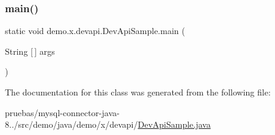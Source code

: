 \mbox{\label{classdemo_1_1x_1_1devapi_1_1_dev_api_sample_a9fecf4c0145ac4788eb0768d9f1d04a4}} 
\subsubsection{\texorpdfstring{main()}{main()}}
{\footnotesize\ttfamily static void demo.\+x.\+devapi.\+Dev\+Api\+Sample.\+main (\begin{DoxyParamCaption}\item[{String \mbox{[}$\,$\mbox{]}}]{args }\end{DoxyParamCaption})\hspace{0.3cm}{\ttfamily [static]}}



The documentation for this class was generated from the following file\+:\begin{DoxyCompactItemize}
\item 
pruebas/mysql-\/connector-\/java-\/8../src/demo/java/demo/x/devapi/\mbox{\hyperlink{_dev_api_sample_8java}{Dev\+Api\+Sample.\+java}}\end{DoxyCompactItemize}
